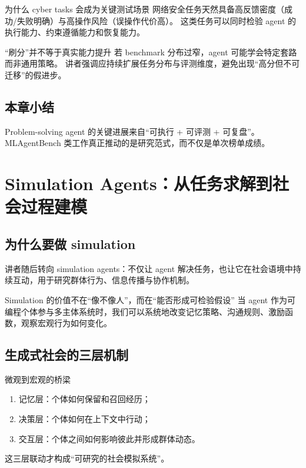 \documentclass[a4paper]{article}
\begin{document}
\begin{knowledgebox}{为什么 cyber tasks 会成为关键测试场景}
网络安全任务天然具备高反馈密度（成功/失败明确）与高操作风险（误操作代价高）。  
这类任务可以同时检验 agent 的执行能力、约束遵循能力和恢复能力。
\end{knowledgebox}

\begin{warningbox}{“刷分”并不等于真实能力提升}
若 benchmark 分布过窄，agent 可能学会特定套路而非通用策略。  
讲者强调应持续扩展任务分布与评测维度，避免出现“高分但不可迁移”的假进步。
\end{warningbox}

\subsection{本章小结}
Problem-solving agent 的关键进展来自“可执行 + 可评测 + 可复盘”。MLAgentBench 类工作真正推动的是研究范式，而不仅是单次榜单成绩。


\section{Simulation Agents：从任务求解到社会过程建模}

\subsection{为什么要做 simulation}
讲者随后转向 simulation agents：不仅让 agent 解决任务，也让它在社会语境中持续互动，用于研究群体行为、信息传播与协作机制。

\begin{importantbox}{Simulation 的价值不在“像不像人”，而在“能否形成可检验假设”}
当 agent 作为可编程个体参与多主体系统时，我们可以系统地改变记忆策略、沟通规则、激励函数，观察宏观行为如何变化。
\end{importantbox}

\subsection{生成式社会的三层机制}
\begin{knowledgebox}{微观到宏观的桥梁}
\begin{enumerate}
    \item 记忆层：个体如何保留和召回经历；
    \item 决策层：个体如何在上下文中行动；
    \item 交互层：个体之间如何影响彼此并形成群体动态。
\end{enumerate}
这三层联动才构成“可研究的社会模拟系统”。
\end{knowledgebox}
\end{document}
